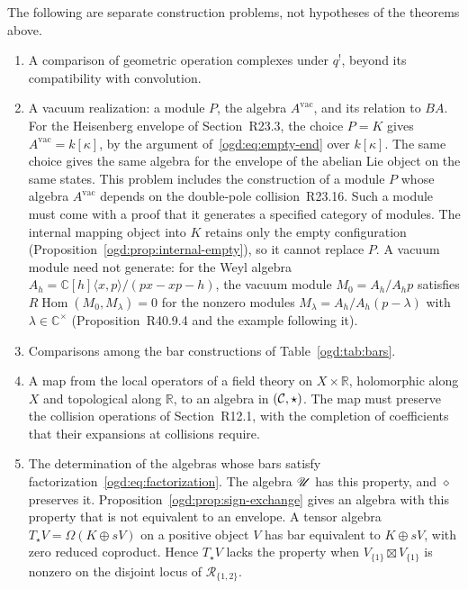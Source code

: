The following are separate construction problems, not hypotheses of the theorems above.
\begin{enumerate}
\item A comparison of geometric operation complexes under \(q^!\), beyond
its compatibility with convolution.
\item A vacuum realization: a module \(P\), the algebra \(A^{\mathrm{vac}}\), and its relation to \(BA\).
For the Heisenberg envelope of Section~\textup{R23.3}, the choice \(P=K\) gives \(A^{\mathrm{vac}}=k[\kappa]\), by the argument of~\eqref{ogd:eq:empty-end} over \(k[\kappa]\).
The same choice gives the same algebra for the envelope of the abelian Lie object on the same states.
This problem includes the construction of a module \(P\) whose algebra \(A^{\mathrm{vac}}\) depends on the double-pole collision~\textup{R23.16}.
Such a module must come with a proof that it generates a specified category of modules.
The internal mapping object into \(K\) retains only the empty configuration (Proposition~\ref{ogd:prop:internal-empty}), so it cannot replace \(P\).
A vacuum module need not generate: for the Weyl algebra \(A_h=\mathbb C[h]\langle x,p\rangle/(px-xp-h)\), the vacuum module \(M_0=A_h/A_hp\) satisfies \(R\operatorname{Hom}(M_0,M_\lambda)=0\) for the nonzero modules \(M_\lambda=A_h/A_h(p-\lambda)\) with \(\lambda\in\mathbb C^\times\) (Proposition~\textup{R40.9.4} and the example following it).
\item Comparisons among the bar constructions of Table~\ref{ogd:tab:bars}.
\item A map from the local operators of a field theory on \(X\times\mathbb R\), holomorphic along \(X\) and topological along \(\mathbb R\), to an algebra in \((\mathcal C,\star)\).
The map must preserve the collision operations of Section~\textup{R12.1}, with the completion of coefficients that their expansions at collisions require.
\item The determination of the algebras whose bars satisfy factorization~\eqref{ogd:eq:factorization}.
The algebra \(\mathscr U\) has this property, and \(\diamond\) preserves it.
Proposition~\ref{ogd:prop:sign-exchange} gives an algebra with this property that is not equivalent to an envelope.
A tensor algebra \(T_\star V=\Omega(K\oplus sV)\) on a positive object \(V\) has bar equivalent to \(K\oplus sV\), with zero reduced coproduct.
Hence \(T_\star V\) lacks the property when \(V_{\{1\}}\boxtimes V_{\{1\}}\) is nonzero on the disjoint locus of \(\mathscr R_{\{1,2\}}\).
\end{enumerate}

